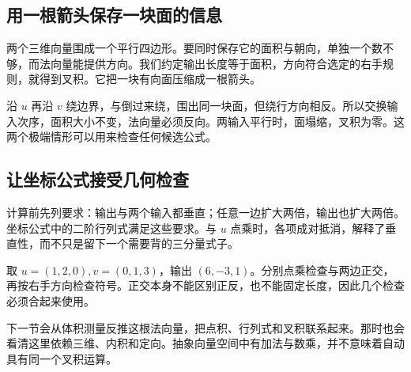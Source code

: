 \subsection*{用一根箭头保存一块面的信息}
两个三维向量围成一个平行四边形。要同时保存它的面积与朝向，单独一个数不够，而法向量能提供方向。我们约定输出长度等于面积，方向符合选定的右手规则，就得到叉积。它把一块有向面压缩成一根箭头。

沿 $u$ 再沿 $v$ 绕边界，与倒过来绕，围出同一块面，但绕行方向相反。所以交换输入次序，面积大小不变，法向量必须反向。两输入平行时，面塌缩，叉积为零。这两个极端情形可以用来检查任何候选公式。

\subsection*{让坐标公式接受几何检查}
计算前先列要求：输出与两个输入都垂直；任意一边扩大两倍，输出也扩大两倍。坐标公式中的二阶行列式满足这些要求。与 $u$ 点乘时，各项成对抵消，解释了垂直性，而不只是留下一个需要背的三分量式子。

取 $u=(1,2,0),v=(0,1,3)$，输出 $(6,-3,1)$。分别点乘检查与两边正交，再按右手方向检查符号。正交本身不能区别正反，也不能固定长度，因此几个检查必须合起来使用。

下一节会从体积测量反推这根法向量，把点积、行列式和叉积联系起来。那时也会看清这里依赖三维、内积和定向。抽象向量空间中有加法与数乘，并不意味着自动具有同一个叉积运算。
